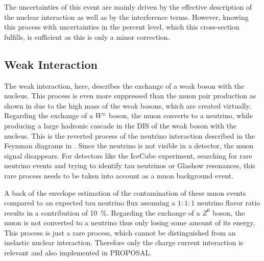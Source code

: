 The uncertainties of this event are mainly driven by the effective description of the nuclear interaction as well as by the interference terms.
However, knowing this process with uncertainties in the percent level, which this cross-section fulfills, is sufficient as this is only a minor correction.

\subsection{Weak Interaction}

The weak interaction, here, describes the exchange of a weak boson with the nucleus.
This process is even more suppressed than the muon pair production as shown in  due to the high mass of the weak bosons, which are created virtually.
Regarding the exchange of a $W^\pm$ boson, the muon converts to a neutrino, while producing a large hadronic cascade in the DIS of the weak boson with the nucleus.
This is the reverted process of the neutrino interaction described in the Feynman diagrams in .
Since the neutrino is not visible in a detector, the muon signal disappears.
For detectors like the IceCube experiment, searching for rare neutrino events and trying to identify tau neutrinos or Glashow resonances, this rare process needs to be taken into account as a muon background event.

A back of the envelope estimation of the contamination of these muon events compared to an expected tau neutrino flux assuming a $1:1:1$ neutrino flavor ratio results in a contribution of \SI{10}{\%}.
Regarding the exchange of a $Z^0$ boson, the muon is not converted to a neutrino thus only losing some amount of its energy.
This process is just a rare process, which cannot be distinguished from an inelastic nuclear interaction.
Therefore only the charge current interaction is relevant and also implemented in PROPOSAL.
 
